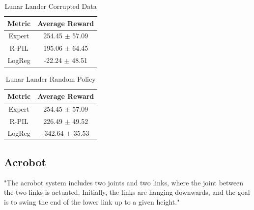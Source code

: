 \documentclass[11pt]{article}
\begin{document}
    
\begin{table}[H]
\caption{Lunar Lander Corrupted Data} %
\centering %
    \begin{tabular}{c c} %
        \hline\hline %
        Metric &  Average Reward \\ [0.5ex] %
        \hline %
        Expert &  254.45 $\pm$ 57.09
         \\ %
        R-PIL & 195.06 $\pm$ 64.45    \\ %
      LogReg & -22.24 $\pm$ 48.51
      \\
        \hline %
    \end{tabular}
\label{LunarLanderCorrupted} %
\end{table}

\begin{table}[H]
\caption{Lunar Lander Random Policy} %
\centering %
    \begin{tabular}{c c} %
        \hline\hline %
        Metric &  Average Reward \\ [0.5ex] %
        \hline %
        Expert &  254.45 $\pm$ 57.09
         \\ %
        R-PIL & 226.49 $\pm$ 49.52   \\ %
       LogReg & -342.64 $\pm$ 35.53\\
        \hline %
    \end{tabular}
\label{LunarLanderRandom} %
\end{table}

\subsection{Acrobot}

\quad "The acrobot system includes two joints and two links, where the joint between the two links is actuated. Initially, the links are hanging downwards, and the goal is to swing the end of the lower link up to a given height." \cite{brockman2016openai}
 
\end{document}
